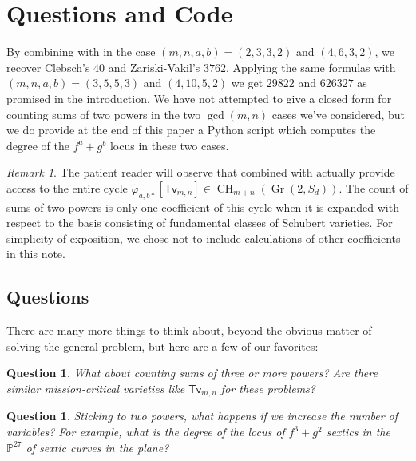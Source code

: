 \documentclass[reqno, 11pt]{amsart}
\theoremstyle{plain}
\newtheorem{question}[theorem]{Question}
\theoremstyle{remark}
\newtheorem{remark}[theorem]{Remark}
\renewcommand{\P}{\mathbb{P}}
\DeclareMathOperator{\Gr}{Gr}
\DeclareMathOperator{\CH}{CH}
\newcommand{\transvectant}{\mathsf{Tv}}
\begin{document}
\section{Questions and Code}
\label{section:conclusion}

By combining  with  in the case $(m,n,a,b) = (2,3,3,2)$ and $(4,6,3,2)$, we recover Clebsch's $40$ and Zariski-Vakil's $3762$.  Applying the same formulas with $(m,n,a,b) = (3,5,5,3)$ and $(4,10,5,2)$ we get $29822$ and $626327$ as promised in the introduction.  We have not attempted to give a closed form for counting sums of two powers in the two $\gcd(m,n)$ cases we've considered, but we do provide at the end of this paper a Python script which computes the degree of the $f^{a} + g^{b}$ locus in these two cases.   

\begin{remark}
    \label{remark:entirecycle} 
    The patient reader will observe that  combined with  actually provide access to the entire cycle $\widetilde{\varphi}_{a,b *}[\transvectant_{m,n}] \in \CH_{m+n}(\Gr(2,S_{d}))$.  The count of sums of two powers is only one coefficient of this cycle when it is expanded with respect to the basis consisting of fundamental classes of Schubert varieties.  For simplicity of exposition, we chose not to include calculations of other coefficients in this note.
\end{remark}

\subsection{Questions}
\label{subsection:questions}

There are many more things to think about, beyond the obvious matter of solving the general problem, but here are a few of our favorites:

\begin{question}
    \label{question:general} What about counting sums of three or more powers? Are there similar mission-critical varieties like $\transvectant_{m,n}$ for these problems?
\end{question}

\begin{question}
    \label{question:higherforms} Sticking to two powers, what happens if we increase the number of variables?  For example, what is the degree of the locus of $f^{3} + g^{2}$ sextics in the $\P^{27}$ of sextic curves in the plane? 
\end{question}
\end{document}
